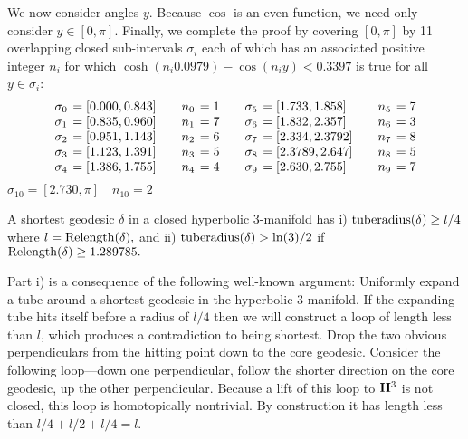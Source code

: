 We now consider angles $y$.  Because $\cos$ is an even function, we need only consider $y \in [0, \pi].$  
Finally, we complete the proof by covering $[0,\pi]$ by 11 overlapping closed sub-intervals $\sigma_i$ each of which has an associated positive integer $n_i$ for which $\cosh(n_i 0.0979) - \cos(n_i y) < 0.3397$ is
 true for all $y \in \sigma_i$:
$$
\begin{array}{rlrlrlrl}
\sigma_0&\hskip-6pt= [0.000, 0.843] &\quad n_0 &\hskip-6pt= 1&\quad
   \sigma_5&\hskip-6pt= [1.733, 1.858] &\quad n_5 &\hskip-6pt= 7\\
 \sigma_1 &\hskip-6pt= [0.835, 0.960] & n_1&\hskip-6pt= 7&
   \sigma_6&\hskip-6pt= [1.832, 2.357] & n_6&\hskip-6pt= 3\\
 \sigma_2&\hskip-6pt= [0.951, 1.143]& n_2&\hskip-6pt= 6&
   \sigma_7&\hskip-6pt= [2.334, 2.3792]& n_7&\hskip-6pt= 8\\
 \sigma_3 &\hskip-6pt= [1.123, 1.391] & n_3&\hskip-6pt= 5&
   \sigma_8&\hskip-6pt= [2.3789, 2.647] & n_8 &\hskip-6pt= 5\\
 \sigma_4&\hskip-6pt= [1.386, 1.755] & n_4 &\hskip-6pt= 4&
   \sigma_9 &\hskip-6pt= [2.630, 2.755]&n_9&\hskip-6pt= 7\\
\end{array}
$$
\hfill $ \sigma_{10}  = [2.730, \pi] \quad  n_{10}  = 2$ 
\enddemo

 A {\rm shortest}  geodesic $\delta$ in a closed hyperbolic $3$\/{\rm -}\/manifold has 
{\rm i)}  ${\rm tuberadius}(\delta) \ge l/4$ where $l = {\rm Relength}(\delta),$  and
{\rm ii)} ${\rm tuberadius}(\delta) > \ln(3)/2$ if 
${\rm Relength}(\delta) \ge 1.289785.$ 
\endproclaim

 Part i) is a consequence of the following 
well-known argument:
Uniformly expand a tube around a shortest geodesic in the hyperbolic
$3$-manifold. 
If the expanding tube hits itself before a
radius of $l/4$ then we will construct a loop of length less than $l$, which produces a
contradiction to being shortest.  Drop the two obvious perpendiculars from
the hitting point down to the core geodesic. 
Consider the following loop---down one perpendicular, 
follow the shorter direction on the core geodesic,
up the other perpendicular. Because a lift of this loop
to ${\bf H}^3$ is not closed, this loop is homotopically nontrivial.  By
construction it has length less than $l/4 + l/2 + l/4 = l.$  


